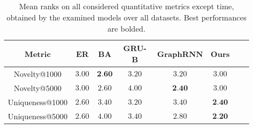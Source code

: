 \begin{table}[h!]
    \footnotesize
    \centering
    \caption{Mean ranks on all considered quantitative metrics except time, obtained by the examined models over all datasets. Best performances are bolded.}
    \label{tab:graph-quantitative-rank}
    \renewcommand{\arraystretch}{1.2}
    \begin{tabular}{cccccccc}
          \toprule
          \textbf{Metric} & \textbf{ER} & \textbf{BA} & \textbf{GRU-B} & \textbf{GraphRNN} & \textbf{Ours} \\
          \midrule
          Novelty@1000    & $3.00$ & $\textbf{2.60}$ & $3.20$ & $3.20$          & $3.00$\\
          Novelty@5000    & $3.00$ & $2.60$          & $4.00$ & $\textbf{2.40}$ & $3.00$\\
          Uniqueness@1000 & $2.60$ & $3.40$          & $3.20$ & $3.40$          & $\textbf{2.40}$\\
          Uniqueness@5000 & $2.60$ & $4.00$          & $3.40$ & $2.80$          & $\textbf{2.20}$\\
          \bottomrule
    \end{tabular}
\end{table}